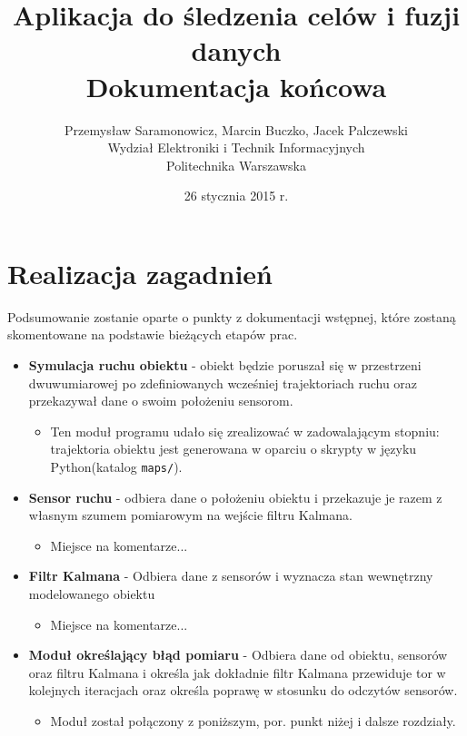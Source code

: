 \documentclass{article}
\title{Aplikacja do śledzenia celów i fuzji danych  \\ {\large Dokumentacja końcowa}}
\author{Przemysław Saramonowicz, Marcin Buczko, Jacek Palczewski \\ Wydział Elektroniki i Technik Informacyjnych \\ Politechnika Warszawska}
\date{26 stycznia 2015 r.}
\begin{document}
	\maketitle
	
	\section{Realizacja zagadnień}
		Podsumowanie zostanie oparte o punkty z dokumentacji wstępnej, które zostaną skomentowane na podstawie bieżących etapów prac.	
		\begin{itemize}
		\item \textbf{Symulacja ruchu obiektu} - obiekt będzie poruszał się w przestrzeni dwuwumiarowej po zdefiniowanych wcześniej trajektoriach ruchu oraz przekazywał dane o swoim położeniu sensorom.
		\begin{itemize}
			\item Ten moduł programu udało się zrealizować w zadowalającym stopniu: trajektoria obiektu jest generowana w oparciu o skrypty w języku Python(katalog \texttt{maps/}).
		\end{itemize}

		\item \textbf{Sensor ruchu} - odbiera dane o położeniu obiektu i przekazuje je razem z własnym szumem pomiarowym na wejście filtru Kalmana.
			\begin{itemize}
				\item Miejsce na komentarze... 
			\end{itemize}

		\item \textbf{Filtr Kalmana} - Odbiera dane z sensorów i wyznacza stan wewnętrzny modelowanego obiektu
			\begin{itemize}
				\item Miejsce na komentarze... 
			\end{itemize}
		
		\item \textbf{Moduł określający błąd pomiaru} - Odbiera dane od obiektu, sensorów oraz filtru Kalmana i określa jak dokładnie filtr Kalmana przewiduje tor w kolejnych iteracjach oraz określa poprawę w stosunku do odczytów sensorów.
			\begin{itemize}
				\item Moduł został połączony z poniższym, por. punkt niżej i dalsze rozdziały.
			\end{itemize}
				

\end{itemize}
\end{document}
